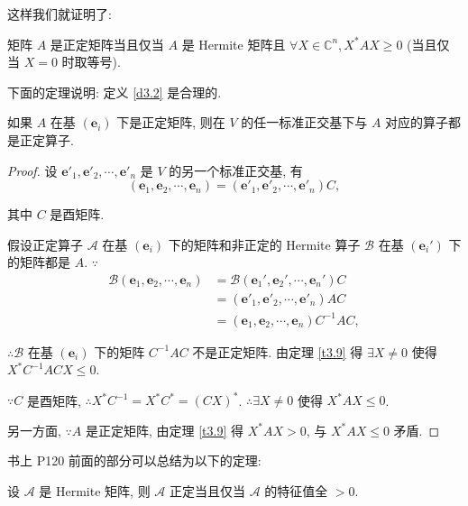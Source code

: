 \documentclass[color=black,device=normal,lang=cn,mode=geye]{elegantnote}
\begin{document}
这样我们就证明了:
\begin{theorem}\label{t3.9}
    矩阵 $A$ 是正定矩阵当且仅当 $A$ 是 Hermite 矩阵且 $\forall X\in\mathbb{C}^n,X^*AX\geq0$ (当且仅当 $X=0$ 时取等号).
\end{theorem}
下面的定理说明: 定义 \ref{d3.2} 是合理的.
\begin{theorem}\label{t3.10}
    如果 $A$ 在基 $(\boldsymbol{e}_i)$ 下是正定矩阵, 则在 $V$ 的任一标准正交基下与 $A$ 对应的算子都是正定算子.
\end{theorem}
\begin{proof}
    设 $\boldsymbol{e}'_1,\boldsymbol{e}'_2,\cdots,\boldsymbol{e}'_n$ 是 $V$ 的另一个标准正交基, 有
    \[(\boldsymbol{e}_1,\boldsymbol{e}_2,\cdots,\boldsymbol{e}_n)=(\boldsymbol{e}'_1,\boldsymbol{e}'_2,\cdots,\boldsymbol{e}'_n)C,\]

    其中 $C$ 是酉矩阵.

    假设正定算子 $\mathcal{A}$ 在基 $(\boldsymbol{e}_i)$ 下的矩阵和非正定的 Hermite 算子 $\mathcal{B}$ 在基 $(\boldsymbol{e}_i')$ 下的矩阵都是 $A$. $\because$
    \begin{align*}
        \mathcal{B}(\boldsymbol{e}_1,\boldsymbol{e}_2,\cdots,\boldsymbol{e}_n) & =\mathcal{B}(\boldsymbol{e}_1',\boldsymbol{e}_2',\cdots,\boldsymbol{e}_n')C \\
        & =(\boldsymbol{e}'_1,\boldsymbol{e}'_2,\cdots,\boldsymbol{e}'_n)AC \\
        & =(\boldsymbol{e}_1,\boldsymbol{e}_2,\cdots,\boldsymbol{e}_n)C^{-1}AC,
    \end{align*}

    $\therefore\mathcal{B}$ 在基 $(\boldsymbol{e}_i)$ 下的矩阵 $C^{-1}AC$ 不是正定矩阵. 由定理 \ref{t3.9} 得 $\exists X\neq0$ 使得 $X^*C^{-1}ACX\leq0$.

    $\because C$ 是酉矩阵, $\therefore X^*C^{-1}=X^*C^*=(CX)^*$. $\therefore\exists X\neq0$ 使得 $X^*AX\leq0$.

    另一方面, $\because A$ 是正定矩阵, 由定理 \ref{t3.9} 得 $X^*AX>0$, 与 $X^*AX\leq0$ 矛盾.
\end{proof}
书上 P120 前面的部分可以总结为以下的定理:
\begin{theorem}\label{t3.11}
    设 $\mathcal{A}$ 是 Hermite 矩阵, 则 $\mathcal{A}$ 正定当且仅当 $\mathcal{A}$ 的特征值全 $>0$.
\end{theorem}
\end{document}
